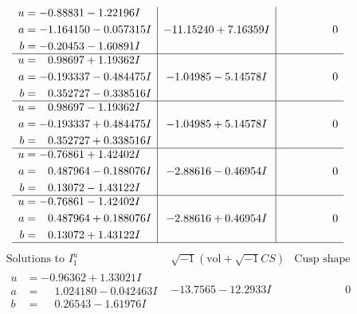 \documentclass[1p]{elsarticle_modified}
\theoremstyle{definition}
\newcommand{\I}{\sqrt{-1}}
\begin{document}
$$\begin{array}{c|c|c}
\begin{aligned}
u &= -0.88831 - 1.22196 I \\
a &= -1.164150 - 0.057315 I \\
b &= -0.20453 - 1.60891 I\end{aligned}
 & -11.15240 + 7.16359 I & \phantom{-0.000000 } 0 \\ \hline\begin{aligned}
u &= \phantom{-}0.98697 + 1.19362 I \\
a &= -0.193337 - 0.484475 I \\
b &= \phantom{-}0.352727 - 0.338516 I\end{aligned}
 & -1.04985 - 5.14578 I & \phantom{-0.000000 } 0 \\ \hline\begin{aligned}
u &= \phantom{-}0.98697 - 1.19362 I \\
a &= -0.193337 + 0.484475 I \\
b &= \phantom{-}0.352727 + 0.338516 I\end{aligned}
 & -1.04985 + 5.14578 I & \phantom{-0.000000 } 0 \\ \hline\begin{aligned}
u &= -0.76861 + 1.42402 I \\
a &= \phantom{-}0.487964 - 0.188076 I \\
b &= \phantom{-}0.13072 - 1.43122 I\end{aligned}
 & -2.88616 - 0.46954 I & \phantom{-0.000000 } 0 \\ \hline\begin{aligned}
u &= -0.76861 - 1.42402 I \\
a &= \phantom{-}0.487964 + 0.188076 I \\
b &= \phantom{-}0.13072 + 1.43122 I\end{aligned}
 & -2.88616 + 0.46954 I & \phantom{-0.000000 } 0\\
 \hline 
 \end{array}$$\newpage$$\begin{array}{c|c|c}  
\text{Solutions to }I^u_{1}& \I (\text{vol} + \sqrt{-1}CS) & \text{Cusp shape}\\
 \hline 
\begin{aligned}
u &= -0.96362 + 1.33021 I \\
a &= \phantom{-}1.024180 - 0.042463 I \\
b &= \phantom{-}0.26543 - 1.61976 I\end{aligned}
 & -13.7565 - 12.2933 I & \phantom{-0.000000 } 0 \\ \hline\begin{aligned}

\end{aligned}
\end{array}$$
\end{document}

